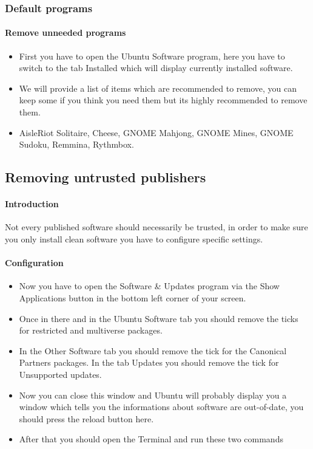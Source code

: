 \documentclass[a4paper,10pt]{article}
\begin{document}
\subsubsection{Default programs}

\paragraph{Remove unneeded programs}

\begin{itemize}[leftmargin=*]
\item First you have to open the Ubuntu Software program, here you have to switch to the tab Installed which will display currently installed software. 
\item We will provide a list of items which are recommended to remove, you can keep some if you think you need them but its highly recommended to remove them.

\item AisleRiot Solitaire, Cheese, GNOME Mahjong, GNOME Mines, GNOME Sudoku, Remmina, Rythmbox.
\end{itemize}





\subsection{Removing untrusted publishers}
\paragraph{Introduction}
Not every published software should necessarily be trusted, in order to make sure you only install clean software you have to configure specific settings.
\paragraph{Configuration}
\begin{itemize}[leftmargin=*]
\item Now you have to open the Software \& Updates program via the Show Applications button in the bottom left corner of your screen. 
\item Once in there and in the Ubuntu Software tab you should remove the ticks for restricted and multiverse packages.  
\item In the Other Software tab you should remove the tick for the Canonical Partners packages. In the tab Updates you should remove the tick for Unsupported updates. 
\item Now you can close this window and Ubuntu will probably display you a window which tells you the informations about software are out-of-date, you should press the reload button here. 
\item After that you should open the Terminal and run these two commands
\end{itemize}
\end{document}
